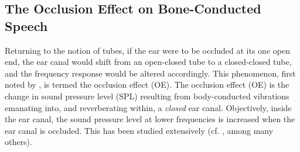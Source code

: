 \DIFaddend 

\subsection{The Occlusion Effect on Bone-Conducted Speech}\label{sec:OEBCspeech}



Returning to the notion of tubes, if the ear were to be occluded at its one open end, the ear canal would shift from an open-closed tube to a closed-closed tube, and the frequency response would be altered accordingly.  This phenomenon, first noted by \cite{wheatstone:79}, is termed the occlusion effect (OE).  The occlusion effect (OE) is the change in sound pressure level (SPL) resulting from body-conducted vibrations emanating into, and reverberating within, a \textit{closed} ear canal.  Objectively, inside the ear canal, the sound pressure level at lower frequencies is increased when the ear canal is occluded.  This has been studied extensively (cf. \cite{wheatstone:79,kelly:37,littler:52,tonndorf:66}, among many others).  %

\DIFdelbegin {}\DIFdelend \DIFaddbegin {}


